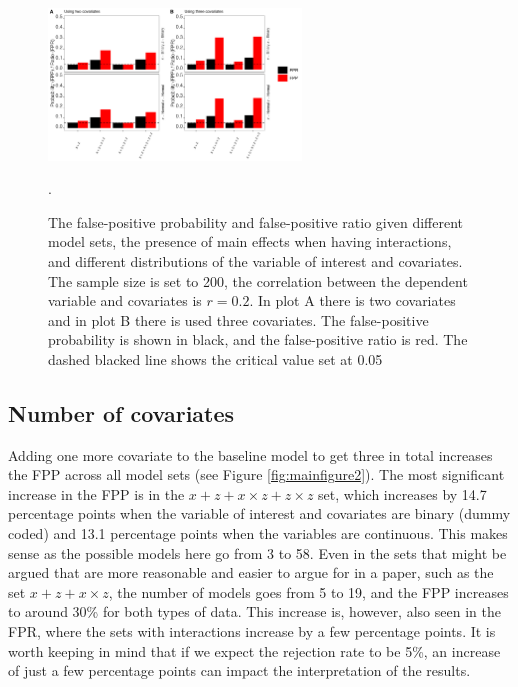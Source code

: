\begin{figure}[hbt!]
\includegraphics[width=0.6\textwidth]{R/Analysis/Result/Figures/Figure1_paper.jpeg}
\centering
\caption{The false-positive probability and false-positive ratio given different model sets, the presence of main effects when having interactions, and different distributions of the variable of interest and covariates. The sample size is set to 200, the correlation between the dependent variable and covariates is $r=0.2$. In plot A there is two covariates and in plot B there is used three covariates. The false-positive probability is shown in black, and the false-positive ratio is red. The dashed blacked line shows the critical value set at 0.05 }.
\label{fig:mainfigure1}
\end{figure}

\subsection{Number of covariates}
Adding one more covariate to the baseline model to get three in total increases the FPP across all model sets (see Figure \ref{fig:mainfigure2}).  The most significant increase in the FPP is in the $x + z+ x \times z + z \times z$ set, which increases by 14.7 percentage points when the variable of interest and covariates are binary (dummy coded) and 13.1 percentage points when the variables are continuous. This makes sense as the possible models here go from 3 to 58. Even in the sets that might be argued that are more reasonable and easier to argue for in a paper, such as the set $x + z+ x \times z $, the number of models goes from 5 to 19, and the FPP increases to around 30\% for both types of data. This increase is, however, also seen in the FPR, where the sets with interactions increase by a few percentage points. It is worth keeping in mind that if we expect the rejection rate to be 5\%, an increase of just a few percentage points can impact the interpretation of the results.  



